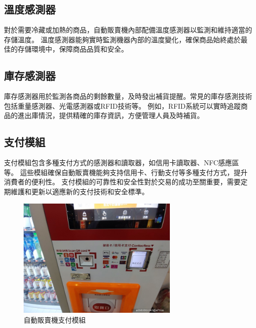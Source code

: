 \documentclass[12pt]{article}       %
\begin{document}
\subsection{溫度感測器} 
\hspace{2em}
對於需要冷藏或加熱的商品，自動販賣機內部配備溫度感測器以監測和維持適當的存儲溫度。
溫度感測器能夠實時監測機器內部的溫度變化，確保商品始終處於最佳的存儲環境中，保障商品品質和安全。

\subsection{庫存感測器} 
\hspace{2em}
庫存感測器用於監測各商品的剩餘數量，及時發出補貨提醒。常見的庫存感測技術包括重量感測器、光電感測器或RFID技術等。
例如，RFID系統可以實時追蹤商品的進出庫情況，提供精確的庫存資訊，方便管理人員及時補貨。

\subsection{支付模組} 
\hspace{2em}
支付模組包含多種支付方式的感測器和讀取器，如信用卡讀取器、NFC感應區等。
這些模組確保自動販賣機能夠支持信用卡、行動支付等多種支付方式，提升消費者的便利性。
支付模組的可靠性和安全性對於交易的成功至關重要，需要定期維護和更新以適應新的支付技術和安全標準。
\begin{figure}[H]
    \centering
    \includegraphics[width=0.7\textwidth]{a0983860343_2_63a7962fecf2018261402695b3dffeef.jpg}     %
    \caption{自動販賣機支付模組\cite{eprice_cashless_vending_machine_2025}}    %
    \label{fig:example3}    %
\end{figure} 
\end{document}
